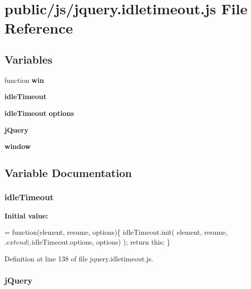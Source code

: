 \section{public/js/jquery.idletimeout.\+js File Reference}
\label{public_2js_2jquery_8idletimeout_8js}
\subsection*{Variables}
\begin{DoxyCompactItemize}
\item 
function {\bf win}
\item 
{\bf idle\+Timeout}
\item 
{\bf idle\+Timeout} {\bf options}
\item 
{\bf j\+Query}
\item 
{\bf window}
\end{DoxyCompactItemize}


\subsection{Variable Documentation}
\subsubsection[{idle\+Timeout}]{\setlength{\rightskip}{0pt plus 5cm}idle\+Timeout}\label{public_2js_2jquery_8idletimeout_8js_adc886feb5b7a76ead000444979cc23a5}
{\bfseries Initial value\+:}
\begin{DoxyCode}
= \textcolor{keyword}{function}(element, resume, options)\{
        idleTimeout.init( element, resume, $.extend($.idleTimeout.options, 
      options) );
        \textcolor{keywordflow}{return} \textcolor{keyword}{this};
    \}
\end{DoxyCode}


Definition at line 138 of file jquery.\+idletimeout.\+js.

\subsubsection[{j\+Query}]{\setlength{\rightskip}{0pt plus 5cm}j\+Query}\label{public_2js_2jquery_8idletimeout_8js_a2b1d6f9c448e3ce72f4e1865d6e38d2c}


